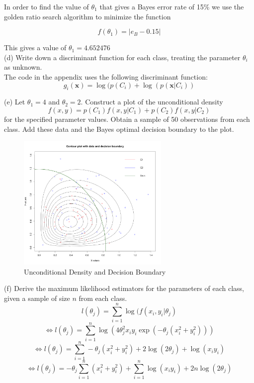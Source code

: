 \documentclass{article}
\begin{document}
In order to find the value of $\theta_{1}$ that gives a Bayes error rate of 15\% we use the golden ratio search algorithm to minimize the function 

$$f(\theta_{1})= |e_{B}-0.15|$$ 

This gives a value of $\theta_{1}=4.652476$\\


(d) Write down a discriminant function for each class, treating the parameter $\theta_{i}$ as unknown. \\

The code in the appendix uses the following discriminant function:
$$g_{i}(\textbf{x})=\log(p(C_{i})+\log(p(\textbf{x}|C_{i}))$$ 

(e) Let $\theta_{1}=4$ and $\theta_{2}=2$. Construct a plot of the unconditional density 
$$f(x,y)=p(C_{1})f(x,y|C_{1})+p(C_{2})f(x,y|C_{2})$$
 for the specified parameter values. Obtain a sample of 50 observations from each class. Add these data and the Bayes optimal decision boundary to the plot. \\

\begin{figure}[H]
\begin{center}
\includegraphics[width=0.65\textwidth]{Q2e} %
\caption{Unconditional Density and Decision Boundary}
\end{center}
\end{figure}

(f) Derive the maximum likelihood estimators for the parameters of each class, given a sample of size $n$ from each class. \\

$$l(\theta_{j})=\sum_{i=1}^{n} \log(f(x_{i},y_{i}|\theta_{j})$$
$$\Leftrightarrow l(\theta_{j})=\sum_{i=1}^{n} \log(4\theta_{j}^2x_{i}y_{i}\exp(-\theta_{j}(x_{i}^2+y_{i}^2)))$$
$$\Leftrightarrow  l(\theta_{j})=\sum_{i=1}^{n} -\theta_{j}(x_{i}^2+y_{i}^2) + 2\log(2\theta_{j})+\log(x_{i}y_{i})$$
$$\Leftrightarrow  l(\theta_{j})= -\theta_{j} \sum_{i=1}^{n}(x_{i}^2+y_{i}^2) +\sum_{i=1}^{n} \log(x_{i}y_{i})+ 2n\log(2\theta_{j})$$
\end{document}
